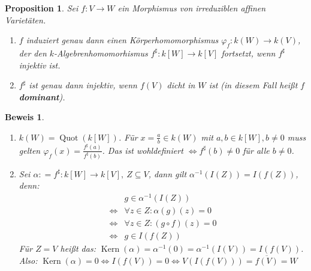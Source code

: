 \documentclass[a4paper,12pt]{report}
\theoremstyle{break}
\newtheorem{Prop}[Def]{Proposition}
\theoremstyle{nonumberbreak}
\theoremstyle{nonumberplain}
\newtheorem{Bew}{Beweis}
\newcommand{\emp}[1]{\textbf{\emph{#1}}}
\newcommand{\begriff}[1]{{\index{#1}}\emp{#1}}
\newcommand{\defeqr}[0]{\mathrel{\mathop:}=}
\DeclareMathOperator{\Quot}{Quot}
\DeclareMathOperator{\Kern}{Kern}
\begin{document}
\begin{Prop}
  \label{prop:6.8}
  Sei $f:V\longrightarrow W$ ein Morphismus von irreduziblen affinen Varietäten.
  \begin{enumerate}
  \item $f$ induziert genau dann einen Körperhomomorphismus $\varphi_f:k(W)\longrightarrow k(V)$, der den $k$-Algebrenhomomorhismus $f^\sharp:k[W]\longrightarrow k[V]$ fortsetzt, wenn $f^\sharp$ injektiv ist.
  \item $f^\sharp$ ist genau dann injektiv, wenn $f(V)$ dicht in $W$ ist (in diesem Fall heißt $f$ \begriff{dominant}).
  \end{enumerate}
\end{Prop}
\begin{Bew}~\\
  \begin{enumerate}
  \item $k(W)=\Quot(k[W])$. Für $x=\frac{a}{b}\in k(W)$ mit $a,b\in k[W],b\neq 0$ muss gelten $\varphi_f(x)=\frac{f^\sharp(a)}{f^\sharp(b)}$. Das ist wohldefiniert $\Leftrightarrow f^\sharp(b)\neq 0$ für alle $b\neq 0$.
  \item Sei $\alpha\defeqr f^\sharp:k[W]\longrightarrow k[V], ~Z\subseteq V$, dann gilt $\alpha^{-1}(I(Z))=I(f(Z))$, denn: \\
    \begin{align*}
      &g\in\alpha^{-1}(I(Z)) \\
      \Leftrightarrow&\forall z\in Z:\alpha(g)(z)=0 \\
      \Leftrightarrow&\forall z\in Z:(g\circ f)(z)=0 \\
      \Leftrightarrow&g\in I(f(Z))
    \end{align*}
    Für $Z=V$ heißt das: $\Kern(\alpha)=\alpha^{-1}(0)=\alpha^{-1}(I(V))=I(f(V))$. Also: $\Kern(\alpha)=0 \Leftrightarrow I(f(V))=0 \Leftrightarrow V(I(f(V)))=\overline{f(V)}=W$
  \end{enumerate}
\end{Bew}
\end{document}
